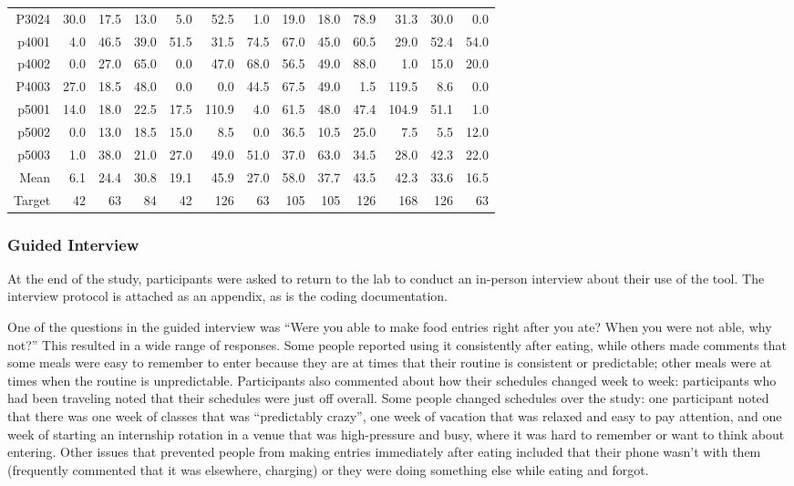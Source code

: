 \begin{table}
\begin{tabular}{rrrrrrrrrrrrr}
    P3024 & 30.0  & 17.5  & 13.0  & 5.0   & 52.5  & 1.0   & 19.0  & 18.0  & 78.9  & 31.3  & 30.0  & 0.0 \\
    p4001 & 4.0   & 46.5  & 39.0  & 51.5  & 31.5  & 74.5  & 67.0  & 45.0  & 60.5  & 29.0  & 52.4  & 54.0 \\
    p4002 & 0.0   & 27.0  & 65.0  & 0.0   & 47.0  & 68.0  & 56.5  & 49.0  & 88.0  & 1.0   & 15.0  & 20.0 \\
    P4003 & 27.0  & 18.5  & 48.0  & 0.0   & 0.0   & 44.5  & 67.5  & 49.0  & 1.5   & 119.5 & 8.6   & 0.0 \\
    p5001 & 14.0  & 18.0  & 22.5  & 17.5  & 110.9 & 4.0   & 61.5  & 48.0  & 47.4  & 104.9 & 51.1  & 1.0 \\
    p5002 & 0.0   & 13.0  & 18.5  & 15.0  & 8.5   & 0.0   & 36.5  & 10.5  & 25.0  & 7.5   & 5.5   & 12.0 \\
    p5003 & 1.0   & 38.0  & 21.0  & 27.0  & 49.0  & 51.0  & 37.0  & 63.0  & 34.5  & 28.0  & 42.3  & 22.0 \\
\midrule
    Mean  & 6.1   & 24.4  & 30.8  & 19.1  & 45.9  & 27.0  & 58.0  & 37.7  & 43.5  & 42.3  & 33.6  & 16.5 \\
\midrule
    Target  & 42   & 63  & 84  & 42  & 126  & 63  & 105  & 105  & 126  & 168  & 126  & 63 \\
    \bottomrule
    \end{tabular}%
  \label{tab:insituComponentCounts}%
\end{table}%


\subsubsection{Guided Interview}
At the end of the study, participants were asked to return to the lab to conduct an in-person interview about their use of the tool. The interview protocol is attached as an appendix, as is the coding documentation. 

One of the questions in the guided interview was ``Were you able to make food entries right after you ate? When you were not able, why not?'' This resulted in a wide range of responses. Some people reported using it consistently after eating, while others made comments that some meals were easy to remember to enter because they are at times that their routine is consistent or predictable; other meals were at times when the routine is unpredictable. Participants also commented about how their schedules changed week to week: participants who had been traveling noted that their schedules were just off overall. Some people changed schedules over the study: one participant noted that there was one week of classes that was ``predictably crazy'', one week of vacation that was relaxed and easy to pay attention, and one week of starting an internship rotation in a venue that was high-pressure and busy, where it was hard to remember or want to think about entering. Other issues that prevented people from making entries immediately after eating included that their phone wasn't with them (frequently commented that it was elsewhere, charging) or they were doing something else while eating and forgot. 

